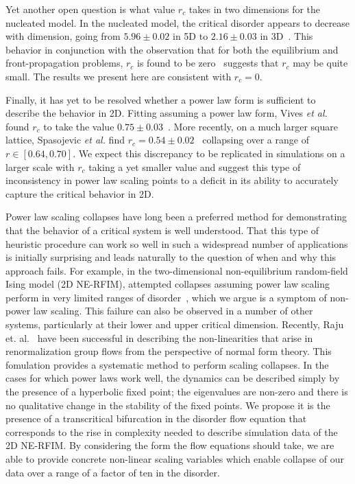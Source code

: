 \documentclass[reprint,amsmath,amssymb,aps,floatfix, prl]{revtex4-1}
\begin{document}
%
Yet another open question is what value $r_c$ takes in two dimensions for the nucleated model. In the nucleated model, the critical disorder appears to decrease with dimension, going from $5.96 \pm 0.02$ in 5D to $2.16 \pm 0.03$ in 3D~\cite{Sethna06}. This behavior in conjunction with the observation that for both the equilibrium and front-propagation problems, $r_c$ is found to be zero~\cite{Drossel98} suggests that $r_c$ may be quite small. The results we present here are consistent with $r_c=0$.\par
%
Finally, it has yet to be resolved whether a power law form is sufficient to describe the behavior in 2D.  Fitting assuming a power law form, Vives {\em et al.} found $r_c$ to take the value $0.75 \pm 0.03$~\cite{Vives95}. More recently, on a much larger square lattice, Spasojevic {\em et al.} find $r_c=0.54\pm0.02$~\cite{Spasojevic11, Spasojevic11-2} collapsing over a range of $r \in [0.64, 0.70]$. We expect this discrepancy to be replicated in simulations on a larger scale with $r_c$ taking a yet smaller value and suggest this type of inconsistency in power law scaling points to a deficit in its ability to accurately capture the critical behavior in 2D.\par
%
Power law scaling collapses have long been a preferred method for demonstrating that the behavior of a critical system is well understood. That this type of heuristic procedure can work so well in such a widespread number of applications is initially surprising and leads naturally to the question of when and why this approach fails. For example, in the two-dimensional non-equilibrium random-field Ising model (2D NE-RFIM),  attempted collapses assuming power law scaling perform in very limited ranges of disorder~\cite{Spasojevic11, Spasojevic11-2, Perkovic96, KuntzPhD}, which we argue is a symptom of non-power law scaling. This failure can also be observed in a number of other systems, particularly at their lower and upper critical dimension. Recently, Raju et. al.~\cite{Raju17} have been successful in describing the non-linearities that arise in renormalization group flows from the perspective of normal form theory. This fomulation provides a systematic method to perform scaling collapses. In the cases for which power laws work well, the dynamics can be described simply by the presence of a hyperbolic fixed point; the eigenvalues are non-zero and there is no qualitative change in the stability of the fixed points. We propose it is the presence of a transcritical bifurcation in the disorder flow equation that corresponds to the rise in complexity needed to describe simulation data of the 2D NE-RFIM. By considering the form the flow equations should take, we are able to provide concrete non-linear scaling variables which enable collapse of our data over a range of a factor of ten in the disorder.\par
\end{document}

